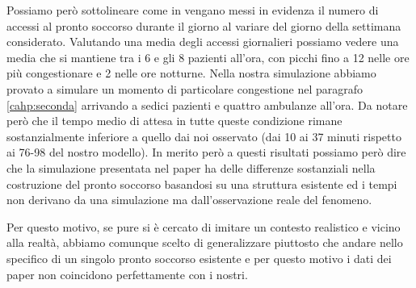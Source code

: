 Possiamo però sottolineare come in \textit{\cite{espinoza_real-time_2014}} vengano messi in evidenza il numero di accessi al pronto soccorso durante il giorno al variare del giorno della settimana considerato. Valutando una media degli accessi giornalieri possiamo vedere una media che si mantiene tra i 6 e gli 8 pazienti all'ora, con picchi fino a 12 nelle ore più congestionare e 2 nelle ore notturne. Nella nostra simulazione abbiamo provato a simulare un momento di particolare congestione nel paragrafo \ref{cahp:seconda} arrivando a sedici pazienti e quattro ambulanze all'ora. Da notare però che il tempo medio di attesa in tutte queste condizione rimane sostanzialmente inferiore a quello dai noi osservato (dai 10 ai 37 minuti rispetto ai 76-98 del nostro modello).
In merito però a questi risultati possiamo però dire che la simulazione presentata nel paper ha delle differenze sostanziali nella costruzione del pronto soccorso basandosi su una struttura esistente ed i tempi non derivano da una simulazione ma dall'osservazione reale del fenomeno.

Per questo motivo, se pure si è cercato di imitare un contesto realistico e vicino alla realtà, abbiamo comunque scelto di generalizzare piuttosto che andare nello specifico di un singolo pronto soccorso esistente e per questo motivo i dati dei paper non coincidono perfettamente con i nostri.
